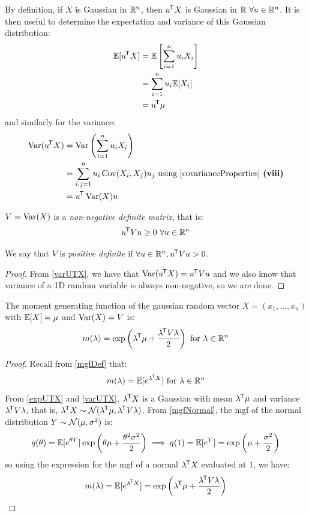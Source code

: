 \documentclass[../main.tex]{subfiles}
\begin{document}
By definition, if $X$ is Gaussian in $\mathbb{R}^{n}$, then $u^{{\mkern-1.5mu\mathsf{T}}} X$ is Gaussian in $\mathbb{R}\ \forall u \in \mathbb{R}^{n}$.
It is then useful to determine the expectation and variance of this Gaussian distribution:
\begin{align}
  \mathbb{E}[u^{{\mkern-1.5mu\mathsf{T}}} X] &= \mathbb{E}\left[\sum_{i = 1}^{n} u_i X_i\right] \nonumber \\
                   &= \sum_{i = 1}^{n} u_i \mathbb{E}[X_i] \nonumber \\
                   &= u^{{\mkern-1.5mu\mathsf{T}}}\mu \label{expUTX}
\end{align}
and similarly for the variance:
\begin{align}
  \Var(u^{\trans} X) &= \Var\left(\sum_{i = 1}^{n} u_i X_i\right) \nonumber \\
                     &= \sum_{i, j = 1}^{n} u_i \Cov(X_i, X_j) u_j \text{ using  \cref{covarianceProperties} \textbf{(viii)}} \nonumber \\
                     &= u^{\trans} \Var(X) u \label{varUTX}
\end{align}
\begin{proposition}
  $V = \operatorname{Var}(X)$ is a \textit{non-negative definite matrix}, that is:
  \[
    u^{{\mkern-1.5mu\mathsf{T}}} V u \geq 0\ \forall u \in \mathbb{R}^{n}
  \]
\end{proposition}
\begin{remark}
  We say that $V$ is \textit{positive definite} if $\forall u \in \mathbb{R}^{n}, u^{{\mkern-1.5mu\mathsf{T}}} V u > 0$.
\end{remark}
\begin{proof}
 From \cref{varUTX}, we have that $\operatorname{Var}(u^{{\mkern-1.5mu\mathsf{T}}} X) = u^{{\mkern-1.5mu\mathsf{T}}} V u$ and we also know that variance of a 1D random variable is always non-negative, so we are done.
\end{proof}
\begin{proposition}
  The moment generating function of the gaussian random vector $X = (x_1, \ldots, x_n)$ with $\mathbb{E}[X] = \mu$ and $\operatorname{Var}(X) = V$ is:
  \[
    m(\lambda) = \exp\left(\lambda^{{\mkern-1.5mu\mathsf{T}}}\mu + \frac{\lambda^{{\mkern-1.5mu\mathsf{T}}} V \lambda}{2}\right) \text{ for $\lambda \in \mathbb{R}^{n}$}
  \]
\end{proposition}
\begin{proof}
  Recall from \cref{mgfDef} that:
  \[
    m(\lambda) = \mathbb{E}[e^{\lambda^{{\mkern-1.5mu\mathsf{T}}} X}] \text{ for } \lambda \in \mathbb{R}^{n}
  \]
  From \cref{expUTX} and \cref{varUTX}, $\lambda^{{\mkern-1.5mu\mathsf{T}}} X$ is a Gaussian with mean $\lambda^{{\mkern-1.5mu\mathsf{T}}} \mu$ and variance $\lambda^{{\mkern-1.5mu\mathsf{T}}} V \lambda$, that is, $\lambda^{{\mkern-1.5mu\mathsf{T}}} X \sim \operatorname{\mathcal{N}}(\lambda^{{\mkern-1.5mu\mathsf{T}}}\mu, \lambda^{{\mkern-1.5mu\mathsf{T}}} V \lambda)$.
  From \cref{mgfNormal}, the mgf of the normal distribution $Y \sim \operatorname{\mathcal{N}}(\mu, \sigma^2)$ is:
  \[
    q(\theta) = \mathbb{E}[e^{\theta Y}]\exp\left(\theta \mu + \frac{\theta^2 \sigma^2}{2}\right) \implies q(1) = \mathbb{E}[e^{Y}] = \exp\left(\mu + \frac{\sigma^2}{2}\right)
  \]
  so using the expression for the mgf of a normal $\lambda^{{\mkern-1.5mu\mathsf{T}}} X$ evaluated at $1$, we have:
  \begin{align*}
    m(\lambda) = \mathbb{E}[e^{\lambda^{{\mkern-1.5mu\mathsf{T}}} X}] = \exp\left(\lambda^{{\mkern-1.5mu\mathsf{T}}}\mu + \frac{\lambda^{{\mkern-1.5mu\mathsf{T}}} V \lambda}{2}\right)
  \end{align*}
\end{proof}
\end{document}
